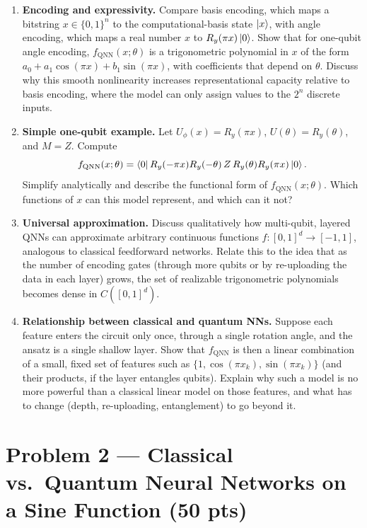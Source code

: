 \documentclass[11pt]{article}
\begin{document}
\begin{enumerate}[label=(\alph*)]
\item \textbf{Encoding and expressivity.}
Compare basis encoding, which maps a bitstring $x\in\{0,1\}^n$ to the computational-basis state $\ket{x}$, with angle encoding, which maps a real number $x$ to $R_y(\pi x)\ket{0}$.
Show that for one-qubit angle encoding, $f_{\mathrm{QNN}}(x;\theta)$ is a trigonometric polynomial in $x$ of the form $a_0+a_1\cos(\pi x)+b_1\sin(\pi x)$, with coefficients that depend on $\theta$.
Discuss why this smooth nonlinearity increases representational capacity relative to basis encoding, where the model can only assign values to the $2^n$ discrete inputs.

\item \textbf{Simple one-qubit example.}
Let $U_\phi(x)=R_y(\pi x)$, $U(\theta)=R_y(\theta)$, and $M=Z$.
Compute
\[
f_{\mathrm{QNN}}(x;\theta)
=\bra{0}R_y(-\pi x)R_y(-\theta)\,Z\,R_y(\theta)R_y(\pi x)\ket{0}.
\]
Simplify analytically and describe the functional form of $f_{\mathrm{QNN}}(x;\theta)$. Which functions of $x$ can this model represent, and which can it not?

\item \textbf{Universal approximation.}
Discuss qualitatively how multi-qubit, layered QNNs can approximate arbitrary continuous functions $f:[0,1]^d\to[-1,1]$, analogous to classical feedforward networks.
Relate this to the idea that as the number of encoding gates (through more qubits or by re-uploading the data in each layer) grows, the set of realizable trigonometric polynomials becomes dense in $C([0,1]^d)$.

\item \textbf{Relationship between classical and quantum NNs.}
Suppose each feature enters the circuit only once, through a single rotation angle, and the ansatz is a single shallow layer. Show that $f_{\mathrm{QNN}}$ is then a linear combination of a small, fixed set of features such as $\{1,\cos(\pi x_k),\sin(\pi x_k)\}$ (and their products, if the layer entangles qubits).
Explain why such a model is no more powerful than a classical linear model on those features, and what has to change (depth, re-uploading, entanglement) to go beyond it.
\end{enumerate}

\newpage
\section*{Problem 2 — Classical vs.\ Quantum Neural Networks on a Sine Function (50 pts)}
\end{document}

